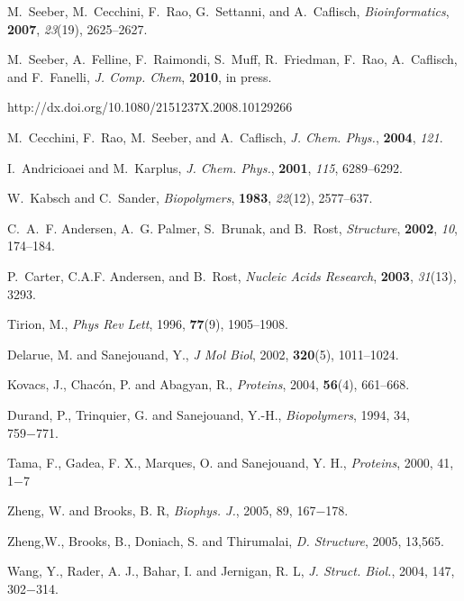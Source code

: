 \documentclass[11pt,twoside,onecolumn,a4paper,openright,notitlepage]{book}[2001/04/21]
\begin{document}
\begin{thebibliography}{10}

M.~Seeber, M.~Cecchini, F.~Rao, G.~Settanni, and A.~Caflisch, {\em
  Bioinformatics}, {\bf 2007}, {\em 23}(19), 2625--2627.

M.~Seeber, A.~Felline, F.~Raimondi, S.~Muff, R.~Friedman, F.~Rao, A.~Caflisch,
  and F.~Fanelli, {\em J. Comp. Chem}, {\bf 2010}, in press.

http://dx.doi.org/10.1080/2151237X.2008.10129266

M.~Cecchini, F.~Rao, M.~Seeber, and A.~Caflisch, {\em J. Chem. Phys.}, {\bf
  2004}, {\em 121}.

I.~{Andricioaei} and M.~{Karplus}, {\em J. Chem. Phys.}, {\bf 2001}, {\em 115},
  6289--6292.

W.~Kabsch and C.~Sander, {\em Biopolymers}, {\bf 1983}, {\em 22}(12),
  2577--637.

C.~A.~F. Andersen, A.~G. Palmer, S.~Brunak, and B.~Rost, {\em Structure}, {\bf
  2002}, {\em 10}, 174--184.

P.~Carter, C.A.F. Andersen, and B.~Rost, {\em Nucleic Acids Research}, {\bf
  2003}, {\em 31}(13), 3293.

Tirion, M., {\em Phys Rev Lett}, 1996, {\bf 77}(9), 1905--1908.

Delarue, M. and Sanejouand, Y., {\em J Mol Biol}, 2002, {\bf 320}(5),
  1011--1024.

Kovacs, J., Chac{\'o}n, P. and Abagyan, R., {\em Proteins}, 2004, {\bf 56}(4),
  661--668.

Durand, P., Trinquier, G. and Sanejouand, Y.-H., {\em Biopolymers}, 1994, 34, 759−771.

Tama, F., Gadea, F. X., Marques, O. and Sanejouand, Y. H., {\em Proteins}, 2000, 41, 1−7

Zheng, W. and Brooks, B. R, {\em Biophys. J.}, 2005, 89, 167−178.

Zheng,W., Brooks, B., Doniach, S. and Thirumalai, {\em D. Structure}, 2005, 13,565.

Wang, Y., Rader, A. J., Bahar, I. and Jernigan, R. L, {\em J. Struct. Biol.}, 2004, 147, 302−314.


\end{thebibliography}
\end{document}
